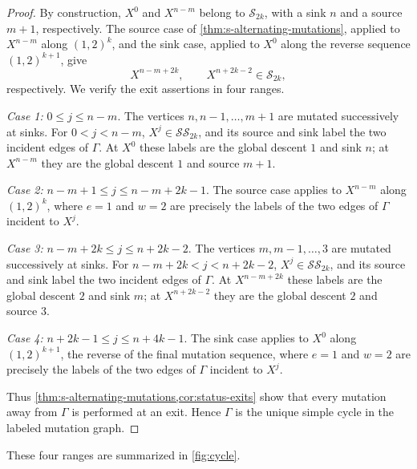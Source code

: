 \documentclass[10pt,a4paper]{amsart}
\theoremstyle{definition}
\theoremstyle{definition}
\numberwithin{equation}{section}
\numberwithin{table}{section}
\newcommand{\SSclass}{\mathcal{SS}}
\newcommand{\Sclass}{\mathcal{S}}
\newcommand{\Xj}[1]{X^{#1}}
\begin{document}
\begin{proof}
By construction, $\Xj{0}$ and $\Xj{n-m}$ belong to $\Sclass_{2k}$, with a
sink $n$ and a source $m+1$, respectively. The source case of
\cref{thm:s-alternating-mutations}, applied to $\Xj{n-m}$ along $(1,2)^k$,
and the sink case, applied to $\Xj{0}$ along the reverse sequence
$(1,2)^{k+1}$, give
\[
 \Xj{n-m+2k},\qquad \Xj{n+2k-2}\in\Sclass_{2k},
\]
respectively. We verify the exit assertions in four ranges.

\emph{Case 1:} $0\le j\le n-m$.
The vertices $n,n-1,\ldots,m+1$ are mutated successively at sinks. For
$0<j<n-m$, $\Xj{j}\in\SSclass_{2k}$, and its source and sink label the two
incident edges of $\Gamma$. At $\Xj{0}$ these labels are the global descent
$1$ and sink $n$; at $\Xj{n-m}$ they are the global descent $1$ and source
$m+1$.

\emph{Case 2:} $n-m+1\le j\le n-m+2k-1$.
The source case applies to
$\Xj{n-m}$ along $(1,2)^k$, where $e=1$ and $w=2$ are precisely the labels
of the two edges of $\Gamma$ incident to $\Xj{j}$.

\emph{Case 3:} $n-m+2k\le j\le n+2k-2$.
The vertices $m,m-1,\ldots,3$ are mutated successively at sinks. For
$n-m+2k<j<n+2k-2$, $\Xj{j}\in\SSclass_{2k}$, and its source and sink label
the two incident edges of $\Gamma$. At $\Xj{n-m+2k}$ these labels are the
global descent $2$ and sink $m$; at $\Xj{n+2k-2}$ they are the global descent
$2$ and source $3$.

\emph{Case 4:} $n+2k-1\le j\le n+4k-1$.
The sink case applies to $\Xj{0}$ along
$(1,2)^{k+1}$, the reverse of the final mutation sequence, where $e=1$ and
$w=2$ are precisely the labels of the two edges of $\Gamma$ incident to
$\Xj{j}$.

Thus \cref{thm:s-alternating-mutations,cor:status-exits} show that every
mutation away from $\Gamma$ is performed at an exit. Hence $\Gamma$ is the
unique simple cycle in the labeled mutation graph.
\end{proof}

These four ranges are summarized in \cref{fig:cycle}.
\end{document}
